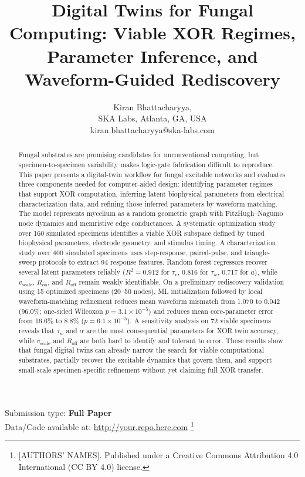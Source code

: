 \documentclass[letterpaper]{article}
\title{Digital Twins for Fungal Computing: Viable XOR Regimes, Parameter Inference, and Waveform-Guided Rediscovery}
\author{
    Kiran Bhattacharyya,
    \mbox{}\\
    SKA Labs, Atlanta, GA, USA \\
    kiran.bhattacharyya@ska-labs.com
} %
\newcommand\blfootnote[1]{%
  \begingroup
  \renewcommand\thefootnote{}\footnote{#1}%
  \addtocounter{footnote}{-1}%
  \endgroup
}
\begin{document}
\maketitle

\begin{abstract}
Fungal substrates are promising candidates for unconventional computing, but specimen-to-specimen variability makes logic-gate fabrication difficult to reproduce. This paper presents a digital-twin workflow for fungal excitable networks and evaluates three components needed for computer-aided design: identifying parameter regimes that support XOR computation, inferring latent biophysical parameters from electrical characterization data, and refining those inferred parameters by waveform matching. The model represents mycelium as a random geometric graph with FitzHugh--Nagumo node dynamics and memristive edge conductances. A systematic optimization study over 160 simulated specimens identifies a viable XOR subspace defined by tuned biophysical parameters, electrode geometry, and stimulus timing. A characterization study over 400 simulated specimens uses step-response, paired-pulse, and triangle-sweep protocols to extract 94 response features. Random forest regressors recover several latent parameters reliably ($R^2=0.912$ for $\tau_v$, $0.816$ for $\tau_w$, $0.717$ for $a$), while $v_{\text{scale}}$, $R_{\mathrm{on}}$, and $R_{\mathrm{off}}$ remain weakly identifiable. On a preliminary rediscovery validation using 15 optimized specimens (20--50 nodes), ML initialization followed by local waveform-matching refinement reduces mean waveform mismatch from 1.070 to 0.042 (96.0\%; one-sided Wilcoxon $p=3.1\times10^{-5}$) and reduces mean core-parameter error from 16.6\% to 8.8\% ($p=6.1\times10^{-5}$). A sensitivity analysis on 72 viable specimens reveals that $\tau_w$ and $\alpha$ are the most consequential parameters for XOR twin accuracy, while $v_{\text{scale}}$ and $R_{\mathrm{off}}$ are both hard to identify and tolerant to error. These results show that fungal digital twins can already narrow the search for viable computational substrates, partially recover the excitable dynamics that govern them, and support small-scale specimen-specific refinement without yet claiming full XOR transfer.
\end{abstract}


Submission type: \textbf{Full Paper}\\

Data/Code available at: \url{http://your.repo.here.com}
\blfootnote{ [AUTHORS' NAMES]. Published under a Creative Commons Attribution 4.0 International (CC BY 4.0) license.}
\end{document}
